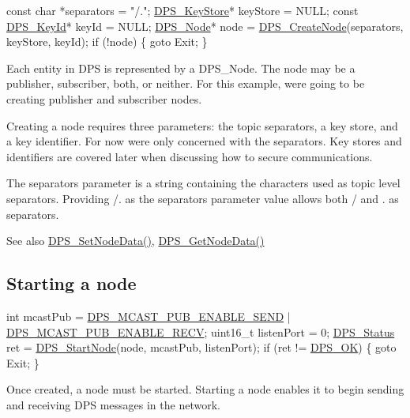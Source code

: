 \begin{DoxyCodeInclude}
    \textcolor{keyword}{const} \textcolor{keywordtype}{char} *separators = \textcolor{stringliteral}{"/."};
    \hyperlink{group__keystore_gaf3833cfe48f848f698514bc5daa075fa}{DPS\_KeyStore}* keyStore = NULL;
    \textcolor{keyword}{const} \hyperlink{struct___d_p_s___key_id}{DPS\_KeyId}* keyId = NULL;
    \hyperlink{group__node_ga4dd612ab965134321bb57fdb065f121c}{DPS\_Node}* node = \hyperlink{group__node_gaf6641b5bbf27b2c45ac7f926b0ce4efe}{DPS\_CreateNode}(separators, keyStore, keyId);
    \textcolor{keywordflow}{if} (!node) \{
        \textcolor{keywordflow}{goto} Exit;
    \}
\end{DoxyCodeInclude}
 Each entity in D\+PS is represented by a {\ttfamily D\+P\+S\+\_\+\+Node}. The node may be a publisher, subscriber, both, or neither. For this example, we\textquotesingle{}re going to be creating publisher and subscriber nodes.

Creating a node requires three parameters\+: the topic separators, a key store, and a key identifier. For now we\textquotesingle{}re only concerned with the separators. Key stores and identifiers are covered later when discussing how to secure communications.

The separators parameter is a string containing the characters used as topic level separators. Providing {\ttfamily /}. as the separators parameter value allows both {\ttfamily /} and {\ttfamily }. as separators.

\begin{DoxySeeAlso}{See also}
\hyperlink{group__node_gad19cf4272ba11e935654175c83db2ce1}{D\+P\+S\+\_\+\+Set\+Node\+Data()}, \hyperlink{group__node_ga65bba7bcfe5e940b153fcced4e2e8880}{D\+P\+S\+\_\+\+Get\+Node\+Data()}
\end{DoxySeeAlso}
\hypertarget{tutorials-hello-world_starting-a-node}{}\subsection{Starting a node}\label{tutorials-hello-world_starting-a-node}

\begin{DoxyCodeInclude}
    \textcolor{keywordtype}{int} mcastPub = \hyperlink{group__node_ga178a3a6450eeff450820fa34fd82049c}{DPS\_MCAST\_PUB\_ENABLE\_SEND} | 
      \hyperlink{group__node_gae493573fb2e02b87258952223eb4fcd7}{DPS\_MCAST\_PUB\_ENABLE\_RECV};
    uint16\_t listenPort = 0;
    \hyperlink{group__status_ga30395a84d3cad9d4ec29848106415038}{DPS\_Status} ret = \hyperlink{group__node_ga160d504bfaeb0d3711e0259000340fe3}{DPS\_StartNode}(node, mcastPub, listenPort);
    \textcolor{keywordflow}{if} (ret != \hyperlink{group__status_ga0ea3dd37bc558859ae0cb5a4f79a4bdd}{DPS\_OK}) \{
        \textcolor{keywordflow}{goto} Exit;
    \}
\end{DoxyCodeInclude}
 Once created, a node must be started. Starting a node enables it to begin sending and receiving D\+PS messages in the network.

